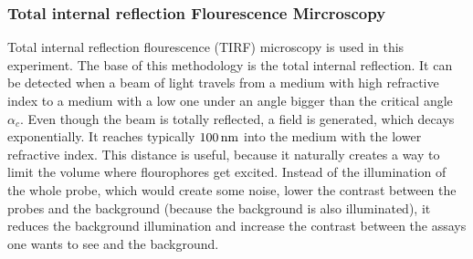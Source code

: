         \subsubsection{Total internal reflection Flourescence Mircroscopy}
            Total internal reflection flourescence (TIRF) microscopy is used in this experiment. The base of this methodology is the total internal reflection. It can be detected when a beam of light travels from a medium with high refractive index to a medium with a low one under an angle bigger than the critical angle $\alpha_c$.
            Even though the beam is totally reflected, a field is generated, which decays exponentially. It reaches typically $\unit[100]{nm}$ into the medium with the lower refractive index.
            This distance is useful, because it naturally creates a way to limit the volume where flourophores get excited. Instead of the illumination of the whole probe, which would create some noise, lower the contrast between the probes and the background (because the background is also illuminated), it reduces the background illumination and increase the contrast between the assays one wants to see and the background.
            
